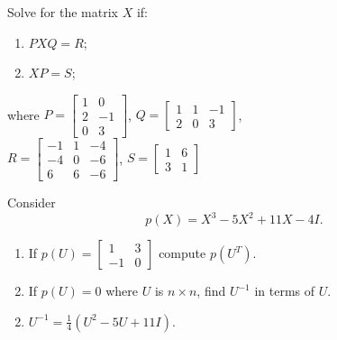 \documentclass{ximera}
\begin{document}
\begin{problem}
Solve for the matrix $X$ if:
\begin{enumerate}
\item $PXQ = R$;
\item $XP = S$;
\end{enumerate}
where
$
P = \left[ \begin{array}{rr}
1 & 0 \\
2 & -1 \\
0 & 3
\end{array} \right]$, $
Q = \left[ \begin{array}{rrr}
1 & 1 & -1 \\
2 & 0 & 3
\end{array} \right]$, \\ $
R = \left[ \begin{array}{rrr}
-1 & 1 & -4 \\
-4 & 0 & -6 \\
6 & 6 & -6
\end{array} \right]$, $
S = \left[ \begin{array}{rr}
1 & 6\\
3 & 1
\end{array} \right]$
\end{problem}

\begin{problem}
Consider \begin{equation*}
p(X) = X^{3} - 5X^{2} + 11X - 4I.
\end{equation*}


\begin{enumerate}[label={\alph*.}]
\item If $p(U) = \left[ \begin{array}{rr}
1 & 3 \\
-1 & 0
\end{array} \right]$
 compute $p(U^{T})$.

\item If $p(U) = 0$ where $U$ is $n \times n$, find $U^{-1}$ in terms of $U$.

\end{enumerate}
\begin{hint}
\begin{enumerate}[label={\alph*.}]
\setcounter{enumi}{1}
\item  $U^{-1} = \frac{1}{4}(U^{2} - 5U + 11I)$.

\end{enumerate}
\end{hint}
\end{problem}
\end{document}
